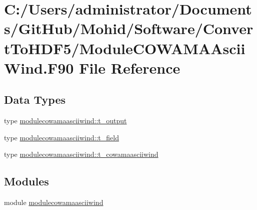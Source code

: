 \hypertarget{_module_c_o_w_a_m_a_ascii_wind_8_f90}{}\section{C\+:/\+Users/administrator/\+Documents/\+Git\+Hub/\+Mohid/\+Software/\+Convert\+To\+H\+D\+F5/\+Module\+C\+O\+W\+A\+M\+A\+Ascii\+Wind.F90 File Reference}
\label{_module_c_o_w_a_m_a_ascii_wind_8_f90}
\subsection*{Data Types}
\begin{DoxyCompactItemize}
\item 
type \mbox{\hyperlink{structmodulecowamaasciiwind_1_1t__output}{modulecowamaasciiwind\+::t\+\_\+output}}
\item 
type \mbox{\hyperlink{structmodulecowamaasciiwind_1_1t__field}{modulecowamaasciiwind\+::t\+\_\+field}}
\item 
type \mbox{\hyperlink{structmodulecowamaasciiwind_1_1t__cowamaasciiwind}{modulecowamaasciiwind\+::t\+\_\+cowamaasciiwind}}
\end{DoxyCompactItemize}
\subsection*{Modules}
\begin{DoxyCompactItemize}
\item 
module \mbox{\hyperlink{namespacemodulecowamaasciiwind}{modulecowamaasciiwind}}
\end{DoxyCompactItemize}

